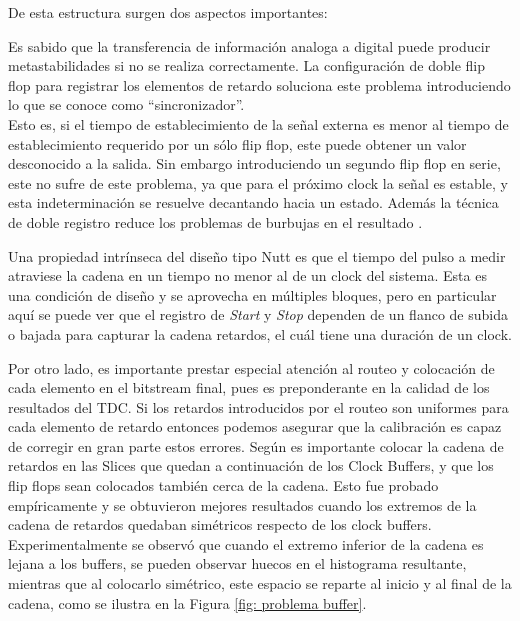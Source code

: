 De esta estructura surgen dos aspectos importantes:
\begin{bangenumerate}
     \item Es sabido que la transferencia de información analoga a digital puede producir metastabilidades si no se 
     realiza correctamente. La configuración de doble flip flop para registrar los elementos de retardo soluciona
     este problema introduciendo lo que se conoce como ``sincronizador''. \\
     Esto es, si el tiempo de establecimiento de la señal
     externa es menor al tiempo de establecimiento requerido por un sólo flip flop, este puede obtener
     un valor desconocido a la salida. Sin embargo introduciendo un segundo flip flop en serie, este no sufre
     de este problema, ya que para el próximo clock la señal es estable, y esta indeterminación se resuelve
     decantando hacia un estado. Además la técnica de doble registro reduce los problemas de burbujas
     en el resultado \cite{machado_novel_2018}.

     \item Una propiedad intrínseca del diseño tipo Nutt es que el tiempo del pulso a medir
     atraviese la cadena en un tiempo no menor al de un clock del sistema. Esta es una condición de diseño
     y se aprovecha en múltiples bloques, pero en particular aquí
     se puede ver que el registro de \textit{Start} y \textit{Stop} dependen de un flanco de subida o bajada para
     capturar la cadena retardos, el cuál tiene una duración de un clock.
\end{bangenumerate}

Por otro lado, es importante prestar especial atención al routeo y colocación de cada elemento en el bitstream final,
pues es preponderante en la calidad de los resultados del TDC. Si los retardos introducidos por el routeo son 
uniformes para cada elemento de retardo entonces podemos asegurar que la calibración es capaz de corregir
en gran parte estos errores. Según \cite{machado_novel_2018} es importante colocar la cadena de retardos en las Slices
que quedan a continuación de los Clock Buffers, y que los flip flops sean colocados también cerca de la cadena. Esto
fue probado empíricamente y se obtuvieron mejores resultados cuando los extremos de la cadena de retardos quedaban simétricos
respecto de los clock buffers.\\
Experimentalmente se observó que cuando el extremo inferior de la cadena es lejana a los buffers, 
se pueden observar huecos en el histograma resultante, mientras que al colocarlo simétrico, este espacio
se reparte al inicio y al final de la cadena, como se ilustra en la Figura \ref{fig: problema buffer}.

